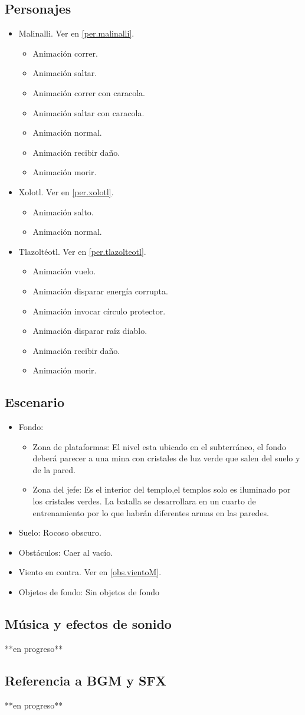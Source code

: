 	\subsection{Personajes}
	\begin{itemize}
		\item Malinalli. Ver en \ref{per.malinalli}.
			\begin{itemize}
			\item Animación correr.
			\item Animación saltar.
			\item Animación correr con caracola.
			\item Animación saltar con caracola.
			\item Animación normal.
			\item Animación recibir daño.
			\item Animación morir.
		\end{itemize}
		\item Xolotl. Ver en \ref{per.xolotl}.
		\begin{itemize}
				\item Animación salto.
				\item Animación normal.
		\end{itemize}
		\item Tlazoltéotl. Ver en \ref{per.tlazolteotl}.
			\begin{itemize}
				\item Animación vuelo.
				\item Animación disparar energía corrupta.
				\item Animación invocar círculo protector.
				\item Animación disparar raíz diablo.
				\item Animación recibir daño.
				\item Animación morir.
			\end{itemize}
	\end{itemize}
\subsection{Escenario}
\begin{itemize} 
	\item Fondo:
	\begin{itemize}
		\item Zona de plataformas:
		El nivel esta ubicado en el subterráneo, el fondo deberá parecer a una mina con cristales de luz verde que salen del suelo y de la pared.
		\item Zona del jefe:
		Es el interior del templo,el templos solo es iluminado por los cristales verdes. La batalla se desarrollara en un cuarto de entrenamiento por lo que habrán diferentes armas en las paredes.
	\end{itemize}
	\item Suelo: Rocoso obscuro.
	\item Obstáculos: Caer al vacío.
	\item Viento en contra. Ver en \ref{obs.vientoM}.
	\item Objetos de fondo: Sin objetos de fondo
\end{itemize}	
	\subsection{Música y efectos de sonido}
	**en progreso**
	\subsection{Referencia a BGM y SFX}
	**en progreso**
	